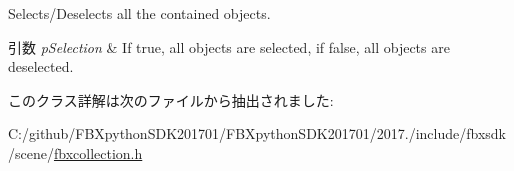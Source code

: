 Selects/\+Deselects all the contained objects. 
\begin{DoxyParams}{引数}
{\em p\+Selection} & If {\ttfamily true}, all objects are selected, if {\ttfamily false}, all objects are deselected. \\
\hline
\end{DoxyParams}


このクラス詳解は次のファイルから抽出されました\+:\begin{DoxyCompactItemize}
\item 
C\+:/github/\+F\+B\+Xpython\+S\+D\+K201701/\+F\+B\+Xpython\+S\+D\+K201701/2017./include/fbxsdk/scene/\hyperlink{fbxcollection_8h}{fbxcollection.\+h}\end{DoxyCompactItemize}
